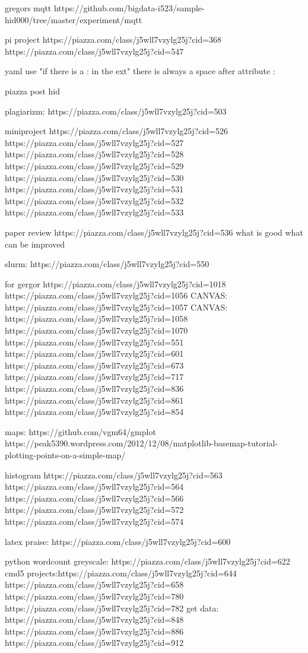 gregors mqtt
https://github.com/bigdata-i523/sample-hid000/tree/master/experiment/mqtt

pi project
https://piazza.com/class/j5wll7vzylg25j?cid=368
https://piazza.com/class/j5wll7vzylg25j?cid=547

yaml
use "if there is a : in the ext"
there is always a space after attribute :

piazza post hid 

plagiarizm: https://piazza.com/class/j5wll7vzylg25j?cid=503

miniproject
https://piazza.com/class/j5wll7vzylg25j?cid=526
https://piazza.com/class/j5wll7vzylg25j?cid=527
https://piazza.com/class/j5wll7vzylg25j?cid=528
https://piazza.com/class/j5wll7vzylg25j?cid=529
https://piazza.com/class/j5wll7vzylg25j?cid=530
https://piazza.com/class/j5wll7vzylg25j?cid=531
https://piazza.com/class/j5wll7vzylg25j?cid=532
https://piazza.com/class/j5wll7vzylg25j?cid=533

paper review
https://piazza.com/class/j5wll7vzylg25j?cid=536
what is good
what can be improved

slurm: https://piazza.com/class/j5wll7vzylg25j?cid=550

for gergor
https://piazza.com/class/j5wll7vzylg25j?cid=1018
https://piazza.com/class/j5wll7vzylg25j?cid=1056
CANVAS: https://piazza.com/class/j5wll7vzylg25j?cid=1057
CANVAS: https://piazza.com/class/j5wll7vzylg25j?cid=1058
https://piazza.com/class/j5wll7vzylg25j?cid=1070
https://piazza.com/class/j5wll7vzylg25j?cid=551
https://piazza.com/class/j5wll7vzylg25j?cid=601
https://piazza.com/class/j5wll7vzylg25j?cid=673
https://piazza.com/class/j5wll7vzylg25j?cid=717
https://piazza.com/class/j5wll7vzylg25j?cid=836
https://piazza.com/class/j5wll7vzylg25j?cid=861
https://piazza.com/class/j5wll7vzylg25j?cid=854

maps:
https://github.com/vgm64/gmplot
https://peak5390.wordpress.com/2012/12/08/matplotlib-basemap-tutorial-plotting-points-on-a-simple-map/

 histogram
https://piazza.com/class/j5wll7vzylg25j?cid=563
https://piazza.com/class/j5wll7vzylg25j?cid=564
https://piazza.com/class/j5wll7vzylg25j?cid=566
https://piazza.com/class/j5wll7vzylg25j?cid=572
https://piazza.com/class/j5wll7vzylg25j?cid=574

latex praise:
https://piazza.com/class/j5wll7vzylg25j?cid=600

python
wordcount
greyscale: https://piazza.com/class/j5wll7vzylg25j?cid=622
cmd5 projects:https://piazza.com/class/j5wll7vzylg25j?cid=644
https://piazza.com/class/j5wll7vzylg25j?cid=658
https://piazza.com/class/j5wll7vzylg25j?cid=780
https://piazza.com/class/j5wll7vzylg25j?cid=782
get data: https://piazza.com/class/j5wll7vzylg25j?cid=848
https://piazza.com/class/j5wll7vzylg25j?cid=886
https://piazza.com/class/j5wll7vzylg25j?cid=912

